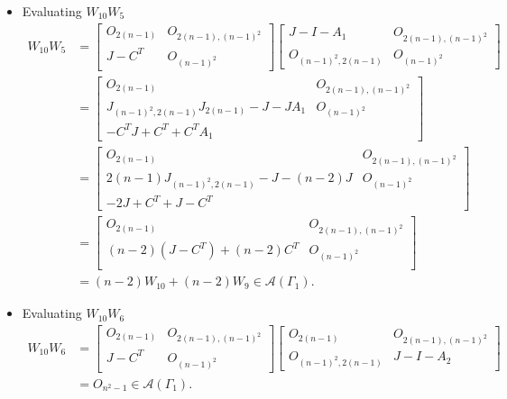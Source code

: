 \begin{itemize}
    \item Evaluating $W_{10}W_5$
    \begin{align*}
        W_{10}W_5
        &=\begin{bmatrix}
            O_{2(n-1)} & O_{2(n-1), (n-1)^2} \\
            J-C^T & O_{(n-1)^2}
        \end{bmatrix}\begin{bmatrix}
            J-I-A_1 & O_{2(n-1), (n-1)^2} \\
            O_{(n-1)^2, 2(n-1)} & O_{(n-1)^2}
        \end{bmatrix}\\
        &= \begin{bmatrix}
            O_{2(n-1)} & O_{2(n-1), (n-1)^2} \\
            J_{(n-1)^2,2(n-1)}J_{2(n-1)} - J- JA_1  & O_{(n-1)^2}\\
             - C^TJ + C^T + C^TA_1 &
        \end{bmatrix}\\
        &= \begin{bmatrix}
            O_{2(n-1)} & O_{2(n-1), (n-1)^2} \\
            2(n-1)J_{(n-1)^2,2(n-1)}-J-(n-2)J  & O_{(n-1)^2}\\
             - 2J + C^T + J-C^T &
        \end{bmatrix}\\
        &= \begin{bmatrix}
            O_{2(n-1)} & O_{2(n-1), (n-1)^2} \\
            (n-2)(J-C^T) + (n-2)C^T  & O_{(n-1)^2}\\
        \end{bmatrix}\\
        &= (n-2)W_{10} + (n-2)W_9\in\mathcal{A}(\Gamma_1).
    \end{align*}
    
    \item Evaluating $W_{10}W_6$
    \begin{align*}
        W_{10}W_6
        &=\begin{bmatrix}
            O_{2(n-1)} & O_{2(n-1), (n-1)^2} \\
            J-C^T & O_{(n-1)^2}
        \end{bmatrix}\begin{bmatrix}
            O_{2(n-1)} & O_{2(n-1), (n-1)^2} \\
            O_{(n-1)^2, 2(n-1)} & J-I-A_2
        \end{bmatrix}\\
        &= O_{n^2-1}\in\mathcal{A}(\Gamma_1).
    \end{align*}
    

\end{itemize}
